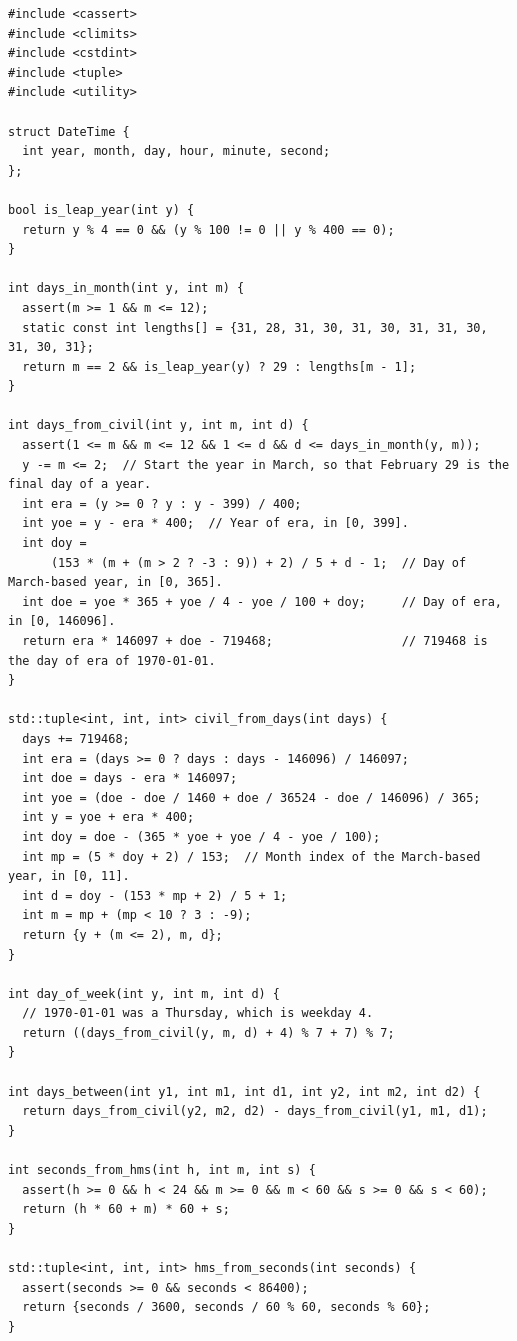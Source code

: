 \begin{lstlisting}[style=cpp]
#include <cassert>
#include <climits>
#include <cstdint>
#include <tuple>
#include <utility>

struct DateTime {
  int year, month, day, hour, minute, second;
};

bool is_leap_year(int y) {
  return y % 4 == 0 && (y % 100 != 0 || y % 400 == 0);
}

int days_in_month(int y, int m) {
  assert(m >= 1 && m <= 12);
  static const int lengths[] = {31, 28, 31, 30, 31, 30, 31, 31, 30, 31, 30, 31};
  return m == 2 && is_leap_year(y) ? 29 : lengths[m - 1];
}

int days_from_civil(int y, int m, int d) {
  assert(1 <= m && m <= 12 && 1 <= d && d <= days_in_month(y, m));
  y -= m <= 2;  // Start the year in March, so that February 29 is the final day of a year.
  int era = (y >= 0 ? y : y - 399) / 400;
  int yoe = y - era * 400;  // Year of era, in [0, 399].
  int doy =
      (153 * (m + (m > 2 ? -3 : 9)) + 2) / 5 + d - 1;  // Day of March-based year, in [0, 365].
  int doe = yoe * 365 + yoe / 4 - yoe / 100 + doy;     // Day of era, in [0, 146096].
  return era * 146097 + doe - 719468;                  // 719468 is the day of era of 1970-01-01.
}

std::tuple<int, int, int> civil_from_days(int days) {
  days += 719468;
  int era = (days >= 0 ? days : days - 146096) / 146097;
  int doe = days - era * 146097;
  int yoe = (doe - doe / 1460 + doe / 36524 - doe / 146096) / 365;
  int y = yoe + era * 400;
  int doy = doe - (365 * yoe + yoe / 4 - yoe / 100);
  int mp = (5 * doy + 2) / 153;  // Month index of the March-based year, in [0, 11].
  int d = doy - (153 * mp + 2) / 5 + 1;
  int m = mp + (mp < 10 ? 3 : -9);
  return {y + (m <= 2), m, d};
}

int day_of_week(int y, int m, int d) {
  // 1970-01-01 was a Thursday, which is weekday 4.
  return ((days_from_civil(y, m, d) + 4) % 7 + 7) % 7;
}

int days_between(int y1, int m1, int d1, int y2, int m2, int d2) {
  return days_from_civil(y2, m2, d2) - days_from_civil(y1, m1, d1);
}

int seconds_from_hms(int h, int m, int s) {
  assert(h >= 0 && h < 24 && m >= 0 && m < 60 && s >= 0 && s < 60);
  return (h * 60 + m) * 60 + s;
}

std::tuple<int, int, int> hms_from_seconds(int seconds) {
  assert(seconds >= 0 && seconds < 86400);
  return {seconds / 3600, seconds / 60 % 60, seconds % 60};
}


\end{lstlisting}
